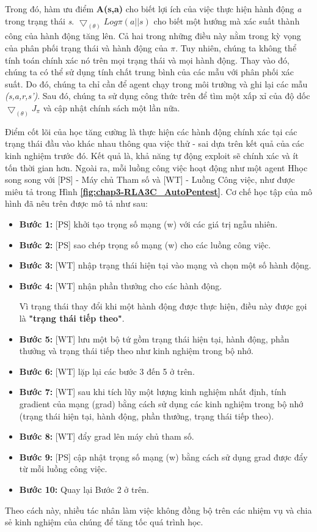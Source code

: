 Trong đó, hàm ưu điểm \textbf{A(s,a)} cho biết lợi ích của việc thực hiện hành động \textit{a} trong trạng thái \textit{s}. $\bigtriangledown_{(\theta)} Log \pi(a||s)$ cho biết một hướng mà xác suất thành công của hành động tăng lên. Cả hai trong những điều này nằm trong kỳ vọng của phân phối trạng thái và hành động của $\pi$. Tuy nhiên, chúng ta không thể tính toán chính xác nó trên mọi trạng thái và mọi hành động. Thay vào đó, chúng ta có thể sử dụng tính chất trung bình của các mẫu với phân phối xác suất. Do đó, chúng ta chỉ cần để agent chạy trong môi trường và ghi lại các mẫu \textit{(s,a,r,s')}. Sau đó, chúng ta sử dụng công thức trên để tìm một xấp xỉ của độ dốc $\bigtriangledown_{(\theta)}J_{\pi}$ và cập nhật chính sách một lần nữa.

Điểm cốt lõi của học tăng cường là thực hiện các hành động chính xác tại các trạng thái đầu vào khác nhau thông qua việc thử - sai dựa trên kết quả của các kinh nghiệm trước đó. Kết quả là, khả năng tự động exploit sẽ chính xác và ít tốn thời gian hơn. Ngoài ra, mỗi luồng công việc hoạt động như một agent Hhọc song song với [PS] - Máy chủ Tham số và [WT] - Luồng Công việc, như được miêu tả trong Hình \textbf{\ref{fig:chap3-RLA3C_AutoPentest}}. Cơ chế học tập của mô hình đã nêu trên được mô tả như sau:

\begin{itemize}
    \item \textbf{Bước 1:} [PS] khởi tạo trọng số mạng (w) với các giá trị ngẫu nhiên.
    \item \textbf{Bước 2:} [PS] sao chép trọng số mạng (w) cho các luồng công việc.
    \item \textbf{Bước 3:} [WT]  nhập trạng thái hiện tại vào mạng và chọn một số hành động.
    \item \textbf{Bước 4:} [WT] nhận phần thưởng cho các hành động. 

Vì trạng thái thay đổi khi một hành động được thực hiện, điều này được gọi là \textbf{"trạng thái tiếp theo"}. 
    \item \textbf{Bước 5:} [WT] lưu một bộ tứ gồm trạng thái hiện tại, hành động, phần thưởng và trạng thái tiếp theo như kinh nghiệm trong bộ nhớ.

    \item \textbf{Bước 6:} [WT] lặp lại các bước 3 đến 5 ở trên.
    \item \textbf{Bước 7:} [WT] sau khi tích lũy một lượng kinh nghiệm nhất định, tính gradient của mạng (grad) bằng cách sử dụng các kinh nghiệm trong bộ nhớ (trạng thái hiện tại, hành động, phần thưởng, trạng thái tiếp theo).
    \item \textbf{Bước 8:} [WT] đẩy grad lên máy chủ tham số. 
    \item \textbf{Bước 9:} [PS] cập nhật trọng số mạng (w) bằng cách sử dụng grad được đẩy từ mỗi luồng công việc. 

    \item \textbf{Bước 10:} Quay lại Bước 2 ở trên.
\end{itemize}

Theo cách này, nhiều tác nhân làm việc không đồng bộ trên các nhiệm vụ và chia sẻ kinh nghiệm của chúng để tăng tốc quá trình học.